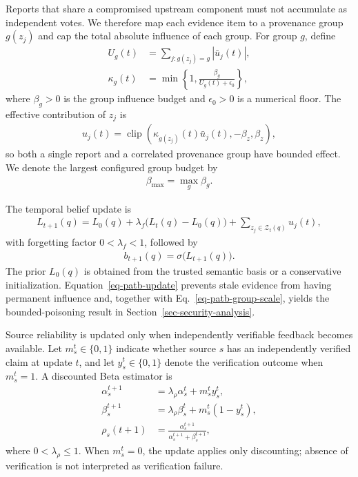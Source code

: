 Reports that share a compromised upstream component must not accumulate as independent votes. We therefore map each evidence item to a provenance group $g(z_j)$ and cap the total absolute influence of each group. For group $g$, define
\begin{align}
U_g(t)&=\sum_{j:g(z_j)=g}|\bar u_j(t)|,\\
\label{eq-patb-group-scale}
\kappa_g(t)&=\min\left\{1,\frac{\beta_g}{U_g(t)+\epsilon_0}\right\},
\end{align}
where $\beta_g>0$ is the group influence budget and $\epsilon_0>0$ is a numerical floor. The effective contribution of $z_j$ is
\begin{align}
\label{eq-patb-effective-influence}
u_j(t)=\operatorname{clip}\!\left(\kappa_{g(z_j)}(t)\bar u_j(t),-\beta_z,\beta_z\right),
\end{align}
so both a single report and a correlated provenance group have bounded effect. We denote the largest configured group budget by
\begin{align}
\label{eq-beta-max}
\beta_{\max}=\max_g\beta_g.
\end{align}

The temporal belief update is
\begin{align}
\label{eq-patb-update}
L_{t+1}(q)=L_0(q)+\lambda_f\big(L_t(q)-L_0(q)\big)
+\sum_{z_j\in\mathcal{Z}_t(q)}u_j(t),
\end{align}
with forgetting factor $0<\lambda_f<1$, followed by
\begin{align}
\label{eq-patb-sigmoid}
b_{t+1}(q)=\sigma\big(L_{t+1}(q)\big).
\end{align}
The prior $L_0(q)$ is obtained from the trusted semantic basis or a conservative initialization. Equation~\ref{eq-patb-update} prevents stale evidence from having permanent influence and, together with Eq.~\ref{eq-patb-group-scale}, yields the bounded-poisoning result in Section~\ref{sec-security-analysis}.

Source reliability is updated only when independently verifiable feedback becomes available. Let $m_s^t\in\{0,1\}$ indicate whether source $s$ has an independently verified claim at update $t$, and let $y_s^t\in\{0,1\}$ denote the verification outcome when $m_s^t=1$. A discounted Beta estimator is
\begin{align}
\alpha_s^{t+1}&=\lambda_\rho\alpha_s^t+m_s^t y_s^t,\\
\beta_s^{t+1}&=\lambda_\rho\beta_s^t+m_s^t(1-y_s^t),\\
\label{eq-source-reliability}
\rho_s(t+1)&=\frac{\alpha_s^{t+1}}{\alpha_s^{t+1}+\beta_s^{t+1}},
\end{align}
where $0<\lambda_\rho\le1$. When $m_s^t=0$, the update applies only discounting; absence of verification is not interpreted as verification failure.

